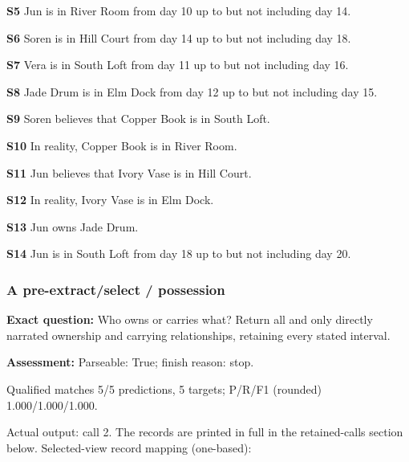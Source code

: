 \noindent\textbf{S5} Jun is in River Room from day 10 up to but not including day 14.\par\smallskip

\noindent\textbf{S6} Soren is in Hill Court from day 14 up to but not including day 18.\par\smallskip

\noindent\textbf{S7} Vera is in South Loft from day 11 up to but not including day 16.\par\smallskip

\noindent\textbf{S8} Jade Drum is in Elm Dock from day 12 up to but not including day 15.\par\smallskip

\noindent\textbf{S9} Soren believes that Copper Book is in South Loft.\par\smallskip

\noindent\textbf{S10} In reality, Copper Book is in River Room.\par\smallskip

\noindent\textbf{S11} Jun believes that Ivory Vase is in Hill Court.\par\smallskip

\noindent\textbf{S12} In reality, Ivory Vase is in Elm Dock.\par\smallskip

\noindent\textbf{S13} Jun owns Jade Drum.\par\smallskip

\noindent\textbf{S14} Jun is in South Loft from day 18 up to but not including day 20.\par\smallskip

\subsubsection*{A pre-extract/select / possession}

\noindent\textbf{Exact question:} Who owns or carries what? Return all and only directly narrated ownership and carrying relationships, retaining every stated interval.\par

\noindent\textbf{Assessment:} Parseable: True; finish reason: stop.

Qualified matches 5/5 predictions, 5 targets; P/R/F1 (rounded) 1.000/1.000/1.000.\par

Actual output: call 2. The records are printed in full in the retained-calls section below. Selected-view record mapping (one-based):

